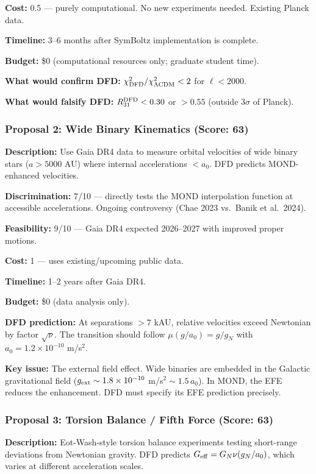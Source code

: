 \documentclass[11pt,a4paper]{article}
\begin{document}
\textbf{Cost:} 0.5 --- purely computational. No new experiments needed. Existing Planck data.

\textbf{Timeline:} 3--6 months after SymBoltz implementation is complete.

\textbf{Budget:} \$0 (computational resources only; graduate student time).

\textbf{What would confirm DFD:} $\chi^2_{\rm DFD}/\chi^2_{\Lambda\rm CDM} < 2$ for $\ell < 2000$.

\textbf{What would falsify DFD:} $R_{31}^{\rm DFD} < 0.30$ or $> 0.55$ (outside $3\sigma$ of Planck).

\subsubsection{Proposal 2: Wide Binary Kinematics (Score: 63)}

\textbf{Description:} Use Gaia DR4 data to measure orbital velocities of wide binary stars ($a > 5000$ AU) where internal accelerations $< a_0$. DFD predicts MOND-enhanced velocities.

\textbf{Discrimination:} 7/10 --- directly tests the MOND interpolation function at accessible accelerations. Ongoing controversy (Chae 2023 vs.\ Banik et al.\ 2024).

\textbf{Feasibility:} 9/10 --- Gaia DR4 expected 2026--2027 with improved proper motions.

\textbf{Cost:} 1 --- uses existing/upcoming public data.

\textbf{Timeline:} 1--2 years after Gaia DR4.

\textbf{Budget:} \$0 (data analysis only).

\textbf{DFD prediction:} At separations $> 7$ kAU, relative velocities exceed Newtonian by factor $\sqrt{\nu}$. The transition should follow $\mu(g/a_0) = g/g_N$ with $a_0 = 1.2\times10^{-10}$ m/s$^2$.

\textbf{Key issue:} The external field effect. Wide binaries are embedded in the Galactic gravitational field ($g_{\rm ext} \sim 1.8\times10^{-10}$ m/s$^2 \sim 1.5\,a_0$). In MOND, the EFE reduces the enhancement. DFD must specify its EFE prediction precisely.

\subsubsection{Proposal 3: Torsion Balance / Fifth Force (Score: 63)}

\textbf{Description:} Eot-Wash-style torsion balance experiments testing short-range deviations from Newtonian gravity. DFD predicts $G_{\rm eff} = G_N\nu(g_N/a_0)$, which varies at different acceleration scales.
\end{document}

